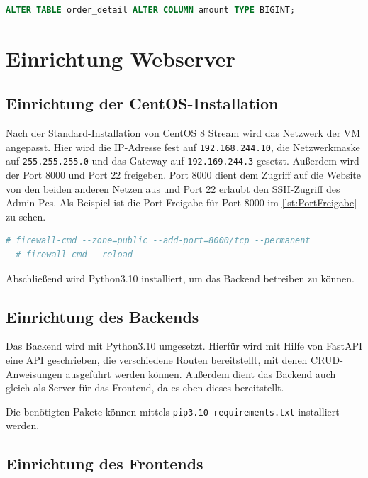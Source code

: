 \documentclass[a4paper,
    11pt,
    headings=small,
    ngerman,
    listof=totoc,
    numbers=noenddot]{scrreprt}[2021/11/13]
\begin{document}
\begin{lstlisting}[language=SQL,caption={Ändern der tickets-Tabelle},label={lst:AlterSQL}]
  ALTER TABLE order_detail ALTER COLUMN amount TYPE BIGINT;
\end{lstlisting}



\newpage
\section{Einrichtung Webserver}


\subsection{Einrichtung der CentOS-Installation}

Nach der Standard-Installation von CentOS 8 Stream wird das Netzwerk der \ac{VM} angepasst. Hier wird die IP-Adresse fest auf \texttt{192.168.244.10}, die Netzwerkmaske auf \texttt{255.255.255.0} und das Gateway auf \texttt{192.169.244.3} gesetzt. Außerdem wird der Port 8000 und Port 22 freigeben. Port 8000 dient dem Zugriff auf die Website von den beiden anderen Netzen aus und Port 22 erlaubt den \ac{SSH}-Zugriff des Admin-Pcs. Als Beispiel ist die Port-Freigabe für Port 8000 im \vref{lst:PortFreigabe} zu sehen.

\begin{lstlisting}[language=bash,caption={Port-Freigabe einer CentOS-Firewall},label={lst:PortFreigabe}]
  # firewall-cmd --zone=public --add-port=8000/tcp --permanent
  # firewall-cmd --reload
\end{lstlisting}

Abschließend wird Python3.10 installiert, um das Backend betreiben zu können.


\subsection{Einrichtung des Backends}

Das Backend wird mit Python3.10 umgesetzt. Hierfür wird mit Hilfe von FastAPI eine \ac{API} geschrieben, die verschiedene Routen bereitstellt, mit denen \ac{CRUD}-Anweisungen ausgeführt werden können. Außerdem dient das Backend auch gleich als Server für das Frontend, da es eben dieses bereitstellt.

Die benötigten Pakete können mittels \texttt{pip3.10 requirements.txt} installiert werden.


\subsection{Einrichtung des Frontends}
\end{document}
